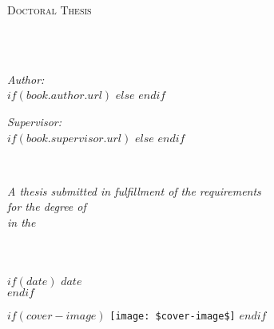 \frontmatter %

\pagestyle{plain} %


\begin{titlepage}
\begin{center}

\vspace*{.06\textheight}
{\scshape\LARGE \univname\par}\vspace{1.5cm} %
\textsc{\Large Doctoral Thesis}\\[0.5cm] %

\HRule \\[0.4cm] %
{\huge \bfseries \ttitle\par}\vspace{0.4cm} %
\HRule \\[1.5cm] %
 
\begin{minipage}[t]{0.4\textwidth}
\begin{flushleft} \large
\emph{Author:}\\
$if(book.author.url)$
\href{$book.author.url$}{\authorname} %
$else$
\authorname
$endif$
\end{flushleft}
\end{minipage}
\begin{minipage}[t]{0.4\textwidth}
\begin{flushright} \large
\emph{Supervisor:} \\
$if(book.supervisor.url)$%
\href{$book.supervisor.url$}{\supname} %
$else$%
\supname
$endif$
\end{flushright}
\end{minipage}\\[3cm]
 
\vfill

\large \textit{A thesis submitted in fulfillment of the requirements\\ for the degree of \degreename}\\[0.3cm] %
\textit{in the}\\[0.4cm]
\groupname\\
\deptname\\[2cm] %
 
\vfill

$if(date)$
{\large $date$}\\[4cm] %
$endif$

$if(cover-image)$
\texttt{[image: \$cover-image\$]} %
$endif$
 
\vfill
\end{center}
\end{titlepage}

